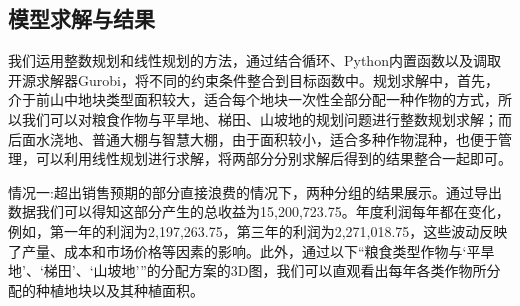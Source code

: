 \documentclass[a4paper]{article}
\begin{document}
	\subsection{模型求解与结果}
	我们运用整数规划和线性规划的方法，通过结合循环、Python内置函数以及调取开源求解器Gurobi，将不同的约束条件整合到目标函数中。规划求解中，首先，介于前山中地块类型面积较大，适合每个地块一次性全部分配一种作物的方式，所以我们可以对粮食作物与平旱地、梯田、山坡地的规划问题进行整数规划求解；而后面水浇地、普通大棚与智慧大棚，由于面积较小，适合多种作物混种，也便于管理，可以利用线性规划进行求解，将两部分分别求解后得到的结果整合一起即可。
	
	情况一:超出销售预期的部分直接浪费的情况下，两种分组的结果展示。通过导出数据我们可以得知这部分产生的总收益为15,200,723.75。年度利润每年都在变化，例如，第一年的利润为2,197,263.75，第三年的利润为2,271,018.75，这些波动反映了产量、成本和市场价格等因素的影响。此外，通过以下“粮食类型作物与‘平旱地’、‘梯田’、‘山坡地’”的分配方案的3D图，我们可以直观看出每年各类作物所分配的种植地块以及其种植面积。
	
	

	
%	
%	
	
\end{document}
